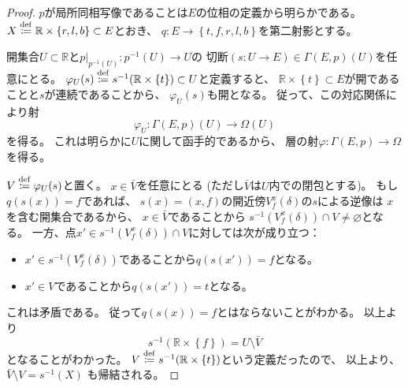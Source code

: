 \documentclass[uplatex]{jsarticle}
\theoremstyle{definition}
\renewcommand{\emptyset}{\varnothing}
\def\R{\mathbb{R}}
\newcommand{\dfn}{\overset{\mathrm{\tiny def}}{\coloneqq}}
\begin{document}
\begin{proof}
  \(p\)が局所同相写像であることは\(E\)の位相の定義から明らかである。
  \(X \dfn \R \times \left\{ r,l,b\right\} \subset E\)とおき、
  \(q:E\to \left\{ t,f,r,l,b\right\}\)を第二射影とする。

  開集合\(U\subset \R\)と\(p|_{p^{-1}(U)}:p^{-1}(U)\to U\)の
  切断\((s:U\to E)\in \Gamma(E,p)(U)\)を任意にとる。
  \(\varphi_U(s) \dfn s^{-1}(\R\times \left\{t\right\})\subset U\)と定義すると、
  \(\R\times \left\{t\right\}\subset E\)が開であることと\(s\)が連続であることから、
  \(\varphi_U(s)\)も開となる。
  従って、この対応関係により射
  \[
  \varphi_U:\Gamma(E,p)(U) \to \Omega(U)
  \]
  を得る。
  これは明らかに\(U\)に関して函手的であるから、
  層の射\(\varphi: \Gamma(E,p)\to \Omega\)を得る。

  \(V \dfn \varphi_U(s)\)と置く。
  \(x\in \bar{V}\)を任意にとる
  (ただし\(\bar{V}\)は\(U\)内での閉包とする)。
  もし\(q(s(x)) = f\)であれば、
  \(s(x)=(x,f)\)の開近傍\(V_f^x(\delta)\)の\(s\)による逆像は
  \(x\)を含む開集合であるから、
  \(x\in\bar{V}\)であることから
  \(s^{-1}(V_f^x(\delta))\cap V \neq \emptyset\)となる。
  一方、点\(x'\in s^{-1}(V_f^x(\delta))\cap V\)に対しては次が成り立つ：
  \begin{itemize}
    \item \(x'\in s^{-1}(V_f^x(\delta))\)であることから\(q(s(x')) = f\)となる。
    \item \(x'\in V\)であることから\(q(s(x')) = t\)となる。
  \end{itemize}
  これは矛盾である。
  従って\(q(s(x)) = f\)とはならないことがわかる。
  以上より
  \[s^{-1}(\R\times \left\{f\right\}) = U\setminus \bar{V}\]
  となることがわかった。
  \(V\dfn s^{-1}(\R\times \left\{ t\right\})\)という定義だったので、
  以上より、
  \(\bar{V}\setminus V = s^{-1}(X)\)
  も帰結される。


\end{proof}
\end{document}
